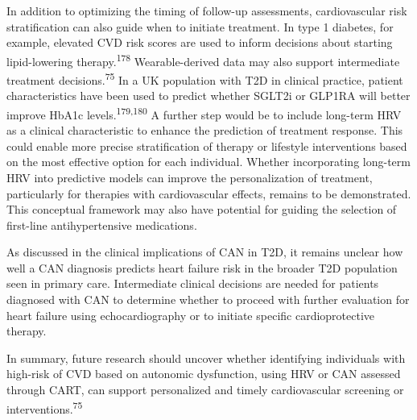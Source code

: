 \documentclass[
  a4paper,
  headsepline=true,
  open=left]{scrbook}
\begin{document}
In addition to optimizing the timing of follow-up assessments,
cardiovascular risk stratification can also guide when to initiate
treatment. In type 1 diabetes, for example, elevated CVD risk scores are
used to inform decisions about starting lipid-lowering
therapy.\textsuperscript{178} Wearable-derived data may also support
intermediate treatment decisions.\textsuperscript{75} In a UK population
with T2D in clinical practice, patient characteristics have been used to
predict whether SGLT2i or GLP1RA will better improve HbA1c
levels.\textsuperscript{179,180} A further step would be to include
long-term HRV as a clinical characteristic to enhance the prediction of
treatment response. This could enable more precise stratification of
therapy or lifestyle interventions based on the most effective option
for each individual. Whether incorporating long-term HRV into predictive
models can improve the personalization of treatment, particularly for
therapies with cardiovascular effects, remains to be demonstrated. This
conceptual framework may also have potential for guiding the selection
of first-line antihypertensive medications.

As discussed in the clinical implications of CAN in T2D, it remains
unclear how well a CAN diagnosis predicts heart failure risk in the
broader T2D population seen in primary care. Intermediate clinical
decisions are needed for patients diagnosed with CAN to determine
whether to proceed with further evaluation for heart failure using
echocardiography or to initiate specific cardioprotective therapy.

In summary, future research should uncover whether identifying
individuals with high-risk of CVD based on autonomic dysfunction, using
HRV or CAN assessed through CART, can support personalized and timely
cardiovascular screening or interventions.\textsuperscript{75}
\end{document}
